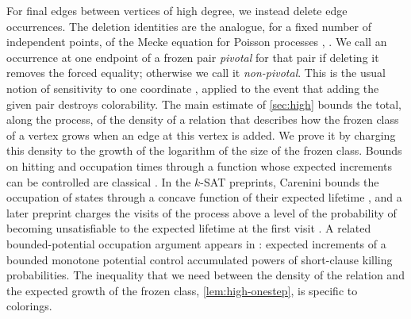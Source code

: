 For final edges between vertices of high degree, we instead delete edge occurrences. The deletion identities are the analogue, for a fixed number of independent points, of the Mecke equation for Poisson processes \cite{mecke1967stationare}, \cite[Theorem~4.1]{last2018lectures}. We call an occurrence at one endpoint of a frozen pair \emph{pivotal} for that pair if deleting it removes the forced equality; otherwise we call it \emph{non-pivotal}. This is the usual notion of sensitivity to one coordinate \cite{russo1982approximate}, applied to the event that adding the given pair destroys colorability. The main estimate of \cref{sec:high} bounds the total, along the process, of the density of a relation that describes how the frozen class of a vertex grows when an edge at this vertex is added. We prove it by charging this density to the growth of the logarithm of the size of the frozen class. Bounds on hitting and occupation times through a function whose expected increments can be controlled are classical \cite[Sections~2--3]{hajek1982hitting}. In the $k$-SAT preprints, Carenini bounds the occupation of states through a concave function of their expected lifetime \cite[Lemma~3.1]{carenini2026polynomial}, and a later preprint charges the visits of the process above a level of the probability of becoming unsatisfiable to the expected lifetime at the first visit \cite[Section~4.1, Lemma~4.1]{openai2026variance}. A related bounded-potential occupation argument appears in \cite[Lemmas~2.2 and~4.1]{openai2026linear}: expected increments of a bounded monotone potential control accumulated powers of short-clause killing probabilities. The inequality that we need between the density of the relation and the expected growth of the frozen class, \cref{lem:high-onestep}, is specific to colorings.

